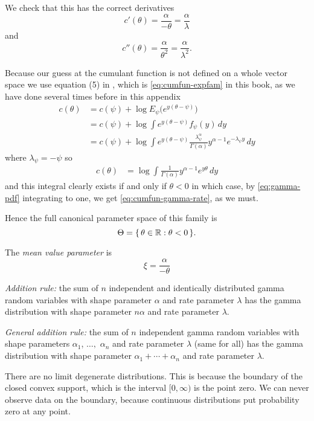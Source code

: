 We check that this has the correct derivatives
$$
   c'(\theta) = \frac{\alpha}{- \theta} = \frac{\alpha}{\lambda}
$$
and
$$
   c''(\theta) = \frac{\alpha}{\theta^2} = \frac{\alpha}{\lambda^2}.
$$

Because our guess at the cumulant function is not defined on a whole vector
space we use equation (5) in \citet{geyer-gdor},
which is \eqref{eq:cumfun-expfam}
in this book, as we have done several times before in this appendix
\begin{align*}
   c(\theta)
   & =
   c(\psi) + \log E_\psi \bigl( e^{y (\theta - \psi)} \bigr)
   \\
   & =
   c(\psi) + \log \int e^{y (\theta - \psi)} f_\psi(y) \, d y
   \\
   & =
   c(\psi) + \log \int e^{y (\theta - \psi)}
   \frac{\lambda_\psi^\alpha}{\Gamma(\alpha)} y^{\alpha - 1}
   e^{- \lambda_\psi y} \, d y
\end{align*}
where $\lambda_\psi = - \psi$ so
\begin{align*}
   c(\theta)
   & =
   \log \int
   \frac{1}{\Gamma(\alpha)} y^{\alpha - 1} e^{y \theta} \, d y
\end{align*}
and this integral clearly exists if and only if $\theta < 0$ in which
case, by \eqref{eq:gamma-pdf} integrating to one,
we get \eqref{eq:cumfun-gamma-rate}, as we must.

Hence the full canonical parameter space of this family is
$$
   \Theta = \{\,  \theta \in \mathbb{R} : \theta < 0  \,\}.
$$

The \emph{mean value parameter} is
$$
   \xi = \frac{\alpha}{- \theta}
$$

\emph{Addition rule:} the sum of $n$ independent and identically distributed
gamma random variables with shape parameter $\alpha$ and rate parameter
$\lambda$ has the gamma distribution
with shape parameter $n \alpha$ and rate parameter $\lambda$.

\emph{General addition rule:} the sum of $n$ independent
gamma random variables with shape parameters $\alpha_1$, $\ldots,$ $\alpha_n$
and rate parameter $\lambda$ (same for all) has the gamma distribution
with shape parameter $\alpha_1 + \cdots + \alpha_n$
and rate parameter $\lambda$.

There are no limit degenerate distributions.
This is because the boundary of the closed convex support,
which is the interval $[0, \infty)$ is the point zero.
We can never observe data on the boundary, because continuous
distributions put probability zero at any point.

